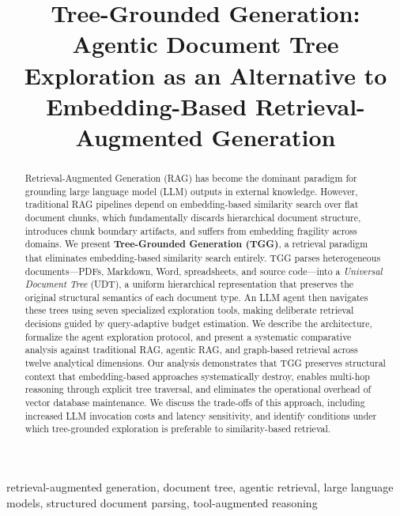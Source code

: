 \documentclass[conference]{IEEEtran}
\begin{document}
\title{Tree-Grounded Generation: Agentic Document Tree Exploration as an Alternative to Embedding-Based Retrieval-Augmented Generation}

\author{
}

\maketitle

\begin{abstract}
Retrieval-Augmented Generation (RAG) has become the dominant paradigm for grounding large language model (LLM) outputs in external knowledge. However, traditional RAG pipelines depend on embedding-based similarity search over flat document chunks, which fundamentally discards hierarchical document structure, introduces chunk boundary artifacts, and suffers from embedding fragility across domains. We present \textbf{Tree-Grounded Generation (TGG)}, a retrieval paradigm that eliminates embedding-based similarity search entirely. TGG parses heterogeneous documents---PDFs, Markdown, Word, spreadsheets, and source code---into a \textit{Universal Document Tree} (UDT), a uniform hierarchical representation that preserves the original structural semantics of each document type. An LLM agent then navigates these trees using seven specialized exploration tools, making deliberate retrieval decisions guided by query-adaptive budget estimation. We describe the architecture, formalize the agent exploration protocol, and present a systematic comparative analysis against traditional RAG, agentic RAG, and graph-based retrieval across twelve analytical dimensions. Our analysis demonstrates that TGG preserves structural context that embedding-based approaches systematically destroy, enables multi-hop reasoning through explicit tree traversal, and eliminates the operational overhead of vector database maintenance. We discuss the trade-offs of this approach, including increased LLM invocation costs and latency sensitivity, and identify conditions under which tree-grounded exploration is preferable to similarity-based retrieval.
\end{abstract}

\begin{IEEEkeywords}
retrieval-augmented generation, document tree, agentic retrieval, large language models, structured document parsing, tool-augmented reasoning
\end{IEEEkeywords}
\end{document}
